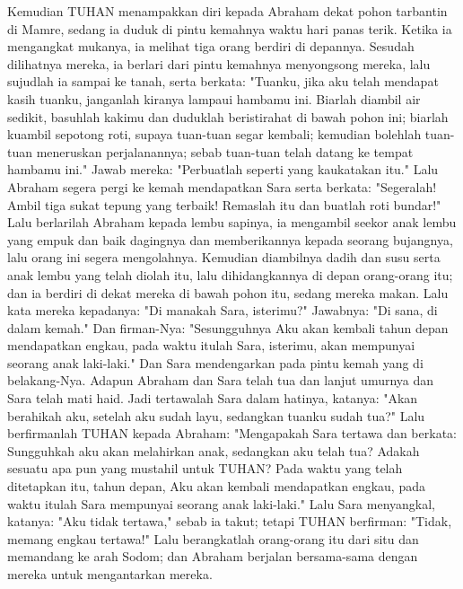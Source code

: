 \begin{biblechapter} %
 Kemudian TUHAN menampakkan diri kepada Abraham dekat pohon tarbantin di Mamre, sedang ia duduk di pintu kemahnya waktu hari panas terik.
\verse Ketika ia mengangkat mukanya, ia melihat tiga orang berdiri di depannya. Sesudah dilihatnya mereka, ia berlari dari pintu kemahnya menyongsong mereka, lalu sujudlah ia sampai ke tanah,
\verse serta berkata: "Tuanku, jika aku telah mendapat kasih tuanku, janganlah kiranya lampaui hambamu ini.
\verse Biarlah diambil air sedikit, basuhlah kakimu dan duduklah beristirahat di bawah pohon ini;
\verse biarlah kuambil sepotong roti, supaya tuan-tuan segar kembali; kemudian bolehlah tuan-tuan meneruskan perjalanannya; sebab tuan-tuan telah datang ke tempat hambamu ini." Jawab mereka: "Perbuatlah seperti yang kaukatakan itu."
\verse Lalu Abraham segera pergi ke kemah mendapatkan Sara serta berkata: "Segeralah! Ambil tiga sukat tepung yang terbaik! Remaslah itu dan buatlah roti bundar!"
\verse Lalu berlarilah Abraham kepada lembu sapinya, ia mengambil seekor anak lembu yang empuk dan baik dagingnya dan memberikannya kepada seorang bujangnya, lalu orang ini segera mengolahnya.
\verse Kemudian diambilnya dadih dan susu serta anak lembu yang telah diolah itu, lalu dihidangkannya di depan orang-orang itu; dan ia berdiri di dekat mereka di bawah pohon itu, sedang mereka makan.
\verse Lalu kata mereka kepadanya: "Di manakah Sara, isterimu?" Jawabnya: "Di sana, di dalam kemah."
\verse Dan firman-Nya: "Sesungguhnya Aku akan kembali tahun depan mendapatkan engkau, pada waktu itulah Sara, isterimu, akan mempunyai seorang anak laki-laki." Dan Sara mendengarkan pada pintu kemah yang di belakang-Nya.
\verse Adapun Abraham dan Sara telah tua dan lanjut umurnya dan Sara telah mati haid.
\verse Jadi tertawalah Sara dalam hatinya, katanya: "Akan berahikah aku, setelah aku sudah layu, sedangkan tuanku sudah tua?"
\verse Lalu berfirmanlah TUHAN kepada Abraham: "Mengapakah Sara tertawa dan berkata: Sungguhkah aku akan melahirkan anak, sedangkan aku telah tua?
\verse Adakah sesuatu apa pun yang mustahil untuk TUHAN? Pada waktu yang telah ditetapkan itu, tahun depan, Aku akan kembali mendapatkan engkau, pada waktu itulah Sara mempunyai seorang anak laki-laki."
\verse Lalu Sara menyangkal, katanya: "Aku tidak tertawa," sebab ia takut; tetapi TUHAN berfirman: "Tidak, memang engkau tertawa!"
 Lalu berangkatlah orang-orang itu dari situ dan memandang ke arah Sodom; dan Abraham berjalan bersama-sama dengan mereka untuk mengantarkan mereka.

\end{biblechapter}
